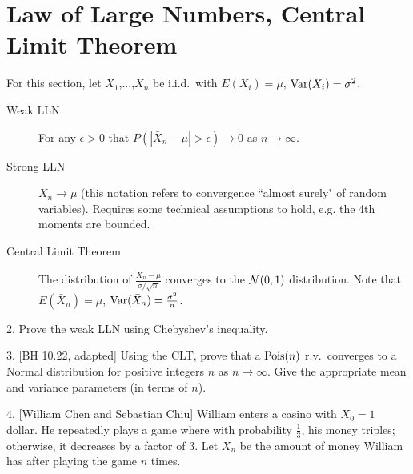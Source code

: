 \documentclass{article}
\begin{document}
\section{Law of Large Numbers, Central Limit Theorem}
For this section, let $X_1$,...,$X_n$ be i.i.d.~with $E(X_i) = \mu$, $\textrm{Var}(X_i) = \sigma^2$.
\begin{description}
\item[Weak LLN] For any $\epsilon>0$ that $P(|\bar{X}_n-\mu| > \epsilon) \rightarrow 0$ as $n \rightarrow \infty$. 

\item[Strong LLN] $\bar{X}_n \rightarrow \mu$ (this notation refers to convergence ``almost surely" of random variables). Requires some technical assumptions to hold, e.g. the 4th moments are bounded.

\item[Central Limit Theorem] The distribution of $\frac{\bar{X}_n-\mu}{\sigma/\sqrt{n}}$ converges to the $\mathcal{N}(0,1)$ distribution. Note that $E(\bar{X}_n) = \mu$, $\textrm{Var}(\bar{X}_n) = \frac{\sigma^2}{n}$. 

\end{description}

2. Prove the weak LLN using Chebyshev's inequality.


3. [BH 10.22, adapted] Using the CLT, prove that a $\textrm{Pois}(n)$ r.v.~converges to a Normal distribution for positive integers $n$ as $n \rightarrow \infty$. Give the appropriate mean and variance parameters (in terms of $n$). 


4. [William Chen and Sebastian Chiu] William enters a casino with $X_0=1$ dollar. He repeatedly plays a game where with probability $\frac{1}{3}$, his money triples; otherwise, it decreases by a factor of $3$. Let $X_n$ be the amount of money William has after playing the game $n$ times. 
\end{document}
